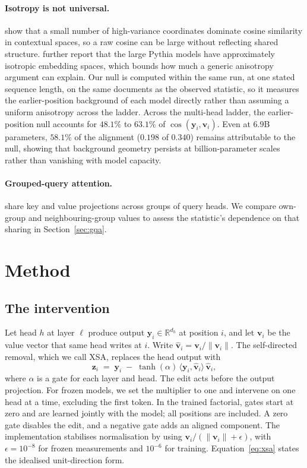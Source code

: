 \documentclass{article} %
\newcommand{\vhat}{\hat{\mathbf{v}}}
\newcommand{\yv}{\mathbf{y}}
\newcommand{\zv}{\mathbf{z}}
\begin{document}
\paragraph{Isotropy is not universal.} \citet{timkey2021bark} show that a
small number of high-variance coordinates dominate cosine similarity in
contextual spaces, so a raw cosine can be large without reflecting shared
structure. \citet{machina2024anisotropy} further report that the large Pythia
models have approximately isotropic embedding spaces, which bounds how much a
generic anisotropy argument can explain. Our null is computed within the same
run, at one stated sequence length, on the same documents as the observed
statistic, so it measures the earlier-position background of each model
directly rather than assuming a uniform anisotropy across the ladder. Across
the multi-head ladder, the earlier-position null accounts for $48.1\%$ to
$63.1\%$ of $\cos(\yv_i, \mathbf{v}_i)$. Even at $6.9$B parameters, $58.1\%$
of the alignment ($0.198$ of $0.340$) remains attributable to the null,
showing that background geometry persists at billion-parameter scales rather
than vanishing with model capacity.

\paragraph{Grouped-query attention.} \citet{ainslie2023gqa} share key and value
projections across groups of query heads. We compare own-group and
neighbouring-group values to assess the statistic's dependence on that sharing in
Section~\ref{sec:gqa}.

\section{Method}
\label{sec:method}

\subsection{The intervention}

Let head $h$ at layer $\ell$ produce output $\yv_i \in \mathbb{R}^{d_h}$ at
position $i$, and let $\mathbf{v}_i$ be the value vector that same head writes
at $i$. Write $\vhat_i = \mathbf{v}_i / \lVert \mathbf{v}_i \rVert$. The
self-directed removal, which we call XSA, replaces the head output with
\begin{equation}
\zv_i \;=\; \yv_i \;-\; \tanh(\alpha)\,\langle \yv_i, \vhat_i\rangle\,\vhat_i ,
\label{eq:xsa}
\end{equation}
where $\alpha$ is a gate for each layer and head. The edit acts before the
output projection. For frozen models, we set the multiplier to one and
intervene on one head at a time, excluding the first token. In the trained
factorial, gates start at zero and are learned jointly with the model; all
positions are included. A zero gate disables the edit, and a negative gate
adds an aligned component. The implementation stabilises normalisation by
using $\mathbf{v}_i/(\lVert\mathbf{v}_i\rVert+\epsilon)$, with
$\epsilon=10^{-8}$ for frozen measurements and $10^{-6}$ for training.
Equation~\ref{eq:xsa} states the idealised unit-direction form.
\end{document}
